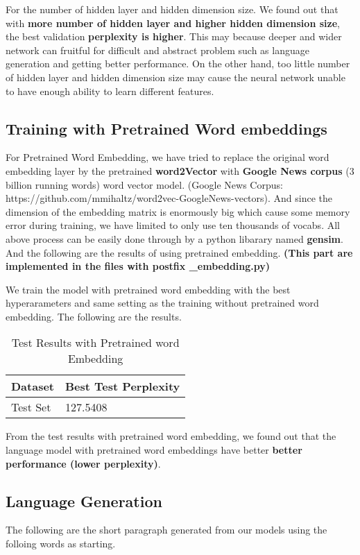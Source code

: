 \documentclass{article}
\begin{document}
For the number of hidden layer and hidden dimension size. We found out that with \textbf{more number of hidden layer and higher hidden dimension size}, the best validation \textbf{perplexity is higher}. This may because deeper and wider network can fruitful for difficult and abstract problem such as language generation and getting better performance. On the other hand, too little number of hidden layer and hidden dimension size may cause the neural network unable to have enough ability to learn different features.

\subsection{Training with Pretrained Word embeddings}
For Pretrained Word Embedding, we have tried to replace the original word embedding layer by the pretrained \textbf{word2Vector} with \textbf{Google News corpus} (3 billion running words) word vector model. (Google News Corpus: https://github.com/mmihaltz/word2vec-GoogleNews-vectors). And since the dimension of the embedding matrix is enormously big which cause some memory error during training, we have limited to only use ten thousands of vocabs. All above process can be easily done through by a python libarary named \textbf{gensim}. And the following are the results of using pretrained embedding. \textbf{(This part are implemented in the files with postfix \_embedding.py)}

We train the model with pretrained word embedding with the best hyperarameters and same setting as the training without pretrained word embedding. The following are the results.

\begin{table}[htb]
	\caption{Test Results with Pretrained word Embedding}
	\label{sample-table}
	\centering
	\begin{tabular}{ll}
		\toprule
		\cmidrule{1-2}
		Dataset & Best Test Perplexity\\
		\midrule
		Test Set & 127.5408   \\
		\bottomrule
	\end{tabular}
\end{table}

From the test results with pretrained word embedding, we found out that the language model with pretrained word embeddings have better \textbf{better performance (lower perplexity)}. 

\subsection{Language Generation}
The following are the short paragraph generated from our models using the folloing words as starting.
\end{document}

